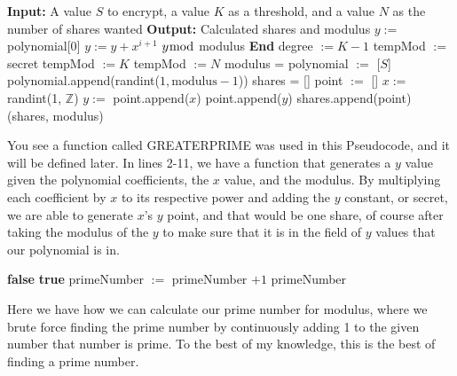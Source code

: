 \documentclass[15pt]{article}
\begin{document}
\begin{flushleft}
\begin{algorithm}[H]
\caption{Encryption}
\begin{algorithmic}[1] %
\Statex \textbf{Input:} A value $S$ to encrypt, a value $K$ as a threshold, and
 a value $N$ as the number of shares wanted
\Statex \textbf{Output:} Calculated shares and modulus
    \State $y:=$ polynomial[$0$]
        \State $y := y + x^{i+1}$
    \EndFor
    \State \Return $y \bmod$ modulus
\EndFunction
\State
    \State \textbf{End}
\EndIf
\State
\State degree $:= K-1$ 
\State
    \State tempMod $:=$ secret
    \State tempMod $:= K$
\Else
    \State tempMod $:= N$
\EndIf
\State modulus = 
\State
\State polynomial $:=$ [$S$]
    \State polynomial.append(randint($1,\text{modulus}-1$))
\EndFor
\State
\State shares = []
    \State point $:=$ []
    \State $x:=$ randint(1, $\mathbb{Z}$)
    \State $y:=$ 
    \State point.append($x$)
    \State point.append($y$)
    \State shares.append(point)
\EndFor
\State \Return (shares, modulus)
\end{algorithmic}
\end{algorithm}
You see a function called GREATERPRIME was used in this Pseudocode, and it will
be defined later. In lines 2-11, we have a function that generates a $y$ value
given the polynomial coefficients, the $x$ value, and the modulus. By
multiplying each coefficient by $x$ to its respective power and adding the $y$
constant, or secret, we are able to generate $x$'s $y$ point, and that would be
one share, of course after taking the modulus of the $y$ to make sure that it is
in the field of $y$ values that our polynomial is in.

\begin{algorithm}[H]
\caption{Prime number functions}
\begin{algorithmic}[1]
             \State \Return \textbf{false}
        \EndIf
        \State \Return \textbf{true}
    \EndFor
\EndFunction
\State
        \State primeNumber $:=$ primeNumber $+1$
    \EndWhile
    \State \Return primeNumber
\EndFunction
\end{algorithmic}
\end{algorithm}
Here we have how we can calculate our prime number for modulus, where we brute
force finding the prime number by continuously adding 1 to the given number
that number is prime. To the best of my knowledge, this is the best of finding
a prime number.


\end{flushleft}
\end{document}
